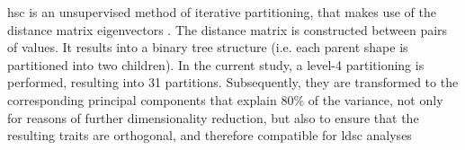 \Acf{hsc} is an unsupervised method of iterative partitioning, that makes use of the distance matrix eigenvectors \cite{Ng2002}. The distance matrix is constructed between pairs of values. It results into a binary tree structure (i.e. each parent shape is partitioned into two children).  In the current study, a level-4 partitioning is performed, resulting into 31 partitions. Subsequently, they are transformed to the corresponding principal components that explain 80\% of the variance, not only for reasons of further dimensionality reduction, but also to ensure that the resulting traits are orthogonal, and therefore compatible for \ac{ldsc} analyses



